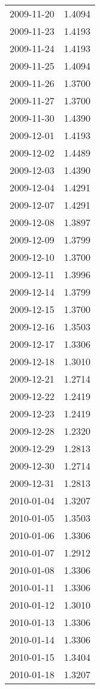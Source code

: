 \begin{tabular}{lr}
2009-11-20 &      1.4094 \\
2009-11-23 &      1.4193 \\
2009-11-24 &      1.4193 \\
2009-11-25 &      1.4094 \\
2009-11-26 &      1.3700 \\
2009-11-27 &      1.3700 \\
2009-11-30 &      1.4390 \\
2009-12-01 &      1.4193 \\
2009-12-02 &      1.4489 \\
2009-12-03 &      1.4390 \\
2009-12-04 &      1.4291 \\
2009-12-07 &      1.4291 \\
2009-12-08 &      1.3897 \\
2009-12-09 &      1.3799 \\
2009-12-10 &      1.3700 \\
2009-12-11 &      1.3996 \\
2009-12-14 &      1.3799 \\
2009-12-15 &      1.3700 \\
2009-12-16 &      1.3503 \\
2009-12-17 &      1.3306 \\
2009-12-18 &      1.3010 \\
2009-12-21 &      1.2714 \\
2009-12-22 &      1.2419 \\
2009-12-23 &      1.2419 \\
2009-12-28 &      1.2320 \\
2009-12-29 &      1.2813 \\
2009-12-30 &      1.2714 \\
2009-12-31 &      1.2813 \\
2010-01-04 &      1.3207 \\
2010-01-05 &      1.3503 \\
2010-01-06 &      1.3306 \\
2010-01-07 &      1.2912 \\
2010-01-08 &      1.3306 \\
2010-01-11 &      1.3306 \\
2010-01-12 &      1.3010 \\
2010-01-13 &      1.3306 \\
2010-01-14 &      1.3306 \\
2010-01-15 &      1.3404 \\
2010-01-18 &      1.3207 \\

\end{tabular}
